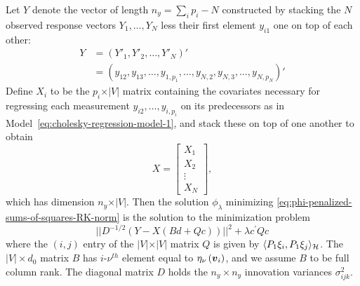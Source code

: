 Let $Y$ denote the vector of length $n_y= \sum_{i} p_i - N$  constructed by stacking the $N$ observed response vectors $Y_1,\dots, Y_N$ less their first element $y_{i1}$ one on top of each other:
\begin{align*}
Y &= \left( Y'_1, Y'_2, \dots, Y'_{N} \right)'\\
 &= \left( y_{12}, y_{13},\dots, y_{1,p_1}, \dots, y_{N,2}, y_{N,3},\dots, y_{N,p_N} \right)'
\end{align*}
\noindent
Define $X_i$ to be the $p_i \times \vert V \vert$ matrix containing the covariates necessary for regressing each measurement $y_{i2}, \dots, y_{i,p_i}$ on its predecessors as in Model~\ref{eq:cholesky-regression-model-1}, and stack these on top of one another to obtain
\begin{equation} \label{eq:ar-design-matrix-1}
X = \begin{bmatrix}
X_1 \\
X_2\\
\vdots \\
X_N
\end{bmatrix},
\end{equation}
\noindent
which has dimension $n_y \times \vert V \vert$. Then the solution $\phi_\lambda$ minimizing \ref{eq:phi-penalized-sums-of-squares-RK-norm}  is the solution to the minimization problem
\begin{equation} \label{eq:penalized-likelihood-vectorized}
\vert \vert D^{-1/2}\left( Y - X \left( Bd + Qc \right) \right) \vert \vert^2  + \lambda c^\prime Q c 
\end{equation}
\noindent
where the $\left(i,j\right)$ entry of the $\vert V \vert \times \vert V \vert$ matrix $Q$ is given by $\langle P_1 \xi_i,  P_1 \xi_j \rangle_{\mathcal{H}}$. The $\vert V \vert \times d_0$ matrix $B$ has $i$-$\nu^{th}$ element equal to $\eta_\nu\left(\mbox{\boldmath $v$}_i\right)$, and we assume $B$ to be full column rank.  The diagonal matrix $D$ holds the $n_y \times n_y$  innovation variances $\sigma^2_{ijk}$. 

\bigskip

